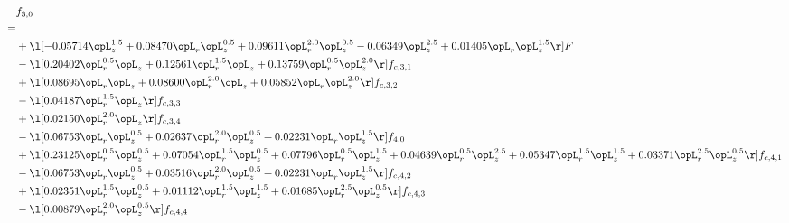\begin{alignat}{2} 
\label{eq:f_30_2} 
& f_{3,0} \nonumber \\ 
 = \\ 
& + \l[  -0.05714 \opL_z^{1.5} +  0.08470 \opL_r \opL_z^{0.5} +  0.09611 \opL_r^{2.0} \opL_z^{0.5}   -0.06349 \opL_z^{2.5} +  0.01405 \opL_r \opL_z^{1.5}  \r] F \nonumber \\ 
& - \l[  0.20402 \opL_r^{0.5} \opL_z +  0.12561 \opL_r^{1.5} \opL_z +  0.13759 \opL_r^{0.5} \opL_z^{2.0}  \r] f_{c,3,1} \nonumber \\ 
& + \l[  0.08695 \opL_r \opL_z +  0.08600 \opL_r^{2.0} \opL_z +  0.05852 \opL_r \opL_z^{2.0}  \r] f_{c,3,2} \nonumber \\ 
& - \l[  0.04187 \opL_r^{1.5} \opL_z  \r] f_{c,3,3} \nonumber \\ 
& + \l[  0.02150 \opL_r^{2.0} \opL_z  \r] f_{c,3,4} \nonumber \\ 
& - \l[  0.06753 \opL_r \opL_z^{0.5} +  0.02637 \opL_r^{2.0} \opL_z^{0.5} +  0.02231 \opL_r \opL_z^{1.5}  \r] f_{4,0} \nonumber \\ 
& + \l[  0.23125 \opL_r^{0.5} \opL_z^{0.5} +  0.07054 \opL_r^{1.5} \opL_z^{0.5} +  0.07796 \opL_r^{0.5} \opL_z^{1.5} +  0.04639 \opL_r^{0.5} \opL_z^{2.5} +  0.05347 \opL_r^{1.5} \opL_z^{1.5} +  0.03371 \opL_r^{2.5} \opL_z^{0.5}  \r] f_{c,4,1} \nonumber \\ 
& - \l[  0.06753 \opL_r \opL_z^{0.5} +  0.03516 \opL_r^{2.0} \opL_z^{0.5} +  0.02231 \opL_r \opL_z^{1.5}  \r] f_{c,4,2} \nonumber \\ 
& + \l[  0.02351 \opL_r^{1.5} \opL_z^{0.5} +  0.01112 \opL_r^{1.5} \opL_z^{1.5} +  0.01685 \opL_r^{2.5} \opL_z^{0.5}  \r] f_{c,4,3} \nonumber \\ 
& - \l[  0.00879 \opL_r^{2.0} \opL_z^{0.5}  \r] f_{c,4,4} \nonumber \\ 
\end{alignat} 


